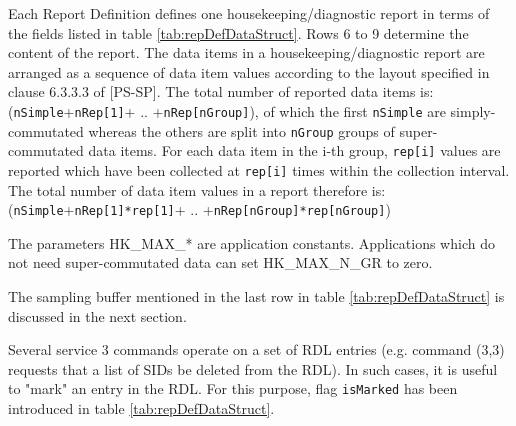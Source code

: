 \documentclass{pnp_article}
\begin{document}
Each Report Definition defines one housekeeping/diagnostic report in terms of the fields listed in table \ref{tab:repDefDataStruct}. Rows 6 to 9 determine the content of the report. The data items in a housekeeping/diagnostic report are arranged as a sequence of data item values according to the layout specified in clause 6.3.3.3 of [PS-SP]. The total number of reported data items is: (\texttt{nSimple}+\texttt{nRep[1]}+ .. +\texttt{nRep[nGroup]}), of which the first \texttt{nSimple} are simply-commutated whereas the others are split into \texttt{nGroup} groups of super-commutated data items. For each data item in the i-th group, \texttt{rep[i]} values are reported which have been collected at \texttt{rep[i]} times within the collection interval. The total number of data item values in a report therefore is: (\texttt{nSimple}+\texttt{nRep[1]*rep[1]}+ .. +\texttt{nRep[nGroup]*rep[nGroup]})

The parameters HK\_MAX\_* are application constants. Applications which do not need super-commutated data can set HK\_MAX\_N\_GR to zero.

The sampling buffer mentioned in the last row in table \ref{tab:repDefDataStruct} is discussed in the next section.

Several service 3 commands operate on a set of RDL entries (e.g. command (3,3) requests that a list of SIDs be deleted from the RDL). In such cases, it is useful to "mark" an entry in the RDL. For this purpose, flag \texttt{isMarked} has been introduced in table \ref{tab:repDefDataStruct}.
\end{document}

